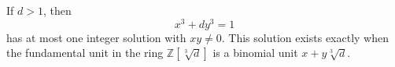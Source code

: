 \begin{proposition}
    If $d>1$, then
\[
    x^3+dy^3=1
\]
    has at most one integer solution with $xy\ne0$. This solution exists exactly when the fundamental unit in the ring $\mathbb{Z}[\sqrt[3]{d}]$ is a binomial unit $x+y\sqrt[3]{d}$.
\end{proposition}
